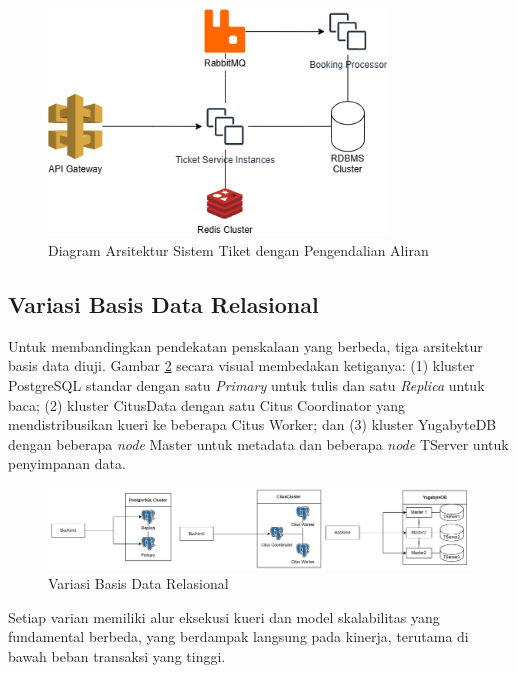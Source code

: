 \begin{figure}[H]
    \centering
    \includegraphics[width=0.8\textwidth]{resources/chapter-3/ticket-fc.png}
    \caption{Diagram Arsitektur Sistem Tiket dengan Pengendalian Aliran}
    \label{fig:ticket-fc}
\end{figure}

\subsection{Variasi Basis Data Relasional}

Untuk membandingkan pendekatan penskalaan yang berbeda, tiga arsitektur basis data diuji. Gambar \ref{fig:rdbms-variation} secara visual membedakan ketiganya: (1) kluster PostgreSQL standar dengan satu \textit{Primary} untuk tulis dan satu \textit{Replica} untuk baca; (2) kluster CitusData dengan satu Citus Coordinator yang mendistribusikan kueri ke beberapa Citus Worker; dan (3) kluster YugabyteDB dengan beberapa \textit{node} Master untuk metadata dan beberapa \textit{node} TServer untuk penyimpanan data.

\begin{figure}[H]
    \centering
    \includegraphics[width=1\textwidth]{resources/chapter-3/rdbms.png}
    \caption{Variasi Basis Data Relasional}
    \label{fig:rdbms-variation}
\end{figure}

Setiap varian memiliki alur eksekusi kueri dan model skalabilitas yang fundamental berbeda, yang berdampak langsung pada kinerja, terutama di bawah beban transaksi yang tinggi.

